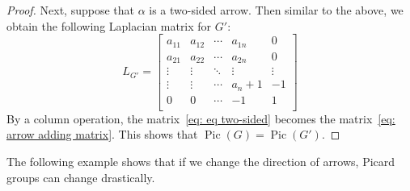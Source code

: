 \documentclass[11pt,reqno]{amsart}
\DeclareMathOperator{\Pic}{Pic}
\theoremstyle{definition}
\newtheorem{conj}[mydef]{Conjecture}
\theoremstyle{plain}
\begin{document}
\begin{proof}
		Next, suppose that $\alpha$ is a two-sided arrow. Then similar to the above, we obtain the following Laplacian matrix for $G'$:
		\begin{equation}\label{eq: eq two-sided}
			L_{G'}=\left[\begin{array}{ccc|c|c}
				a_{11}&a_{12}&\cdots &a_{1n}&0\\
				a_{21}&a_{22}&\cdots &a_{2n}&0\\
				\vdots & \vdots &\ddots & \vdots & \vdots \\ \hline
				\vdots & \vdots & \cdots&a_n+1 & -1\\ \hline
				0&0&\cdots &-1&1\\
			\end{array}\right]
		\end{equation}
		By a column operation, the matrix~\eqref{eq: eq two-sided} becomes the matrix~\eqref{eq: arrow adding matrix}.
		This shows that $\Pic(G)=\Pic(G')$.
	\end{proof}




The following example shows that if we change the direction of arrows, Picard groups can change drastically.
\end{document}
